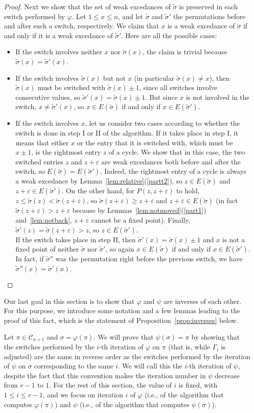 \documentclass[11pt]{amsart}
\newcommand\bit{\begin{itemize}}
\newcommand\eit{\end{itemize}}
\newcommand\C{\mathcal C}
\newcommand\wt{\widetilde}
\newcommand\bij{\varphi}
\newcommand\inv{\psi}
\newcommand\eps{\varepsilon}
\newcommand\sigm{\wt\sigma}
\begin{document}
\begin{proof}
Next we show that the set of weak excedances of $\sigm$ is preserved in each switch performed by $\bij$.
Let $1\le x\le n$, and let $\sigm$ and $\sigm'$ the permutations before and after such a switch, respectively.
We claim that $x$ is a weak excedance of $\sigm$ if and only if it is a weak excedance of $\sigm'$. Here are all the possible cases:
\bit
\item If the switch involves neither $x$ nor $\sigm(x)$, the claim is trivial because $\sigm(x)=\sigm'(x)$.
\item If the switch involves $\sigm(x)$ but not $x$ (in particular $\sigm(x)\neq x$), then $\sigm(x)$ must be switched with $\sigm(x)\pm1$, since all switches involve consecutive values,
so $\sigm'(x)=\sigm(x)\pm1$. But since $x$ is not involved in the switch, $x\neq\sigm'(x)$, so $x\in E(\sigm)$ if and only if $x\in E(\sigm')$.
\item If the switch involves $x$, let us consider two cases according to whether the switch is done in step I or II of the algorithm.
If it takes place in step I, it means that either $x$ or the entry that it is switched with, which must be $x\pm1$,
is the rightmost entry $z$ of a cycle. We show that in this case, the two switched entries $z$ and $z+\eps$ are weak excedances both before and after the switch, so $E(\sigm)=E(\sigm')$.
Indeed, the rightmost entry of a cycle is always a weak excedance by Lemma~\ref{lem:relative}(\ref{partt2}), so $z\in E(\sigm)$ and $z+\eps\in E(\sigm')$.
On the other hand, for $P(z,z+\eps)$ to hold, $z\le \sigm(z)<\sigm(z+\eps)$, so $\sigm(z+\eps)\ge z+\eps$ and $z+\eps\in E(\sigm)$
(in fact $\sigm(z+\eps)> z+\eps$ because by Lemmas~\ref{lem:notmoved}(\ref{part1}) and~\ref{lem:notback}, $z+\eps$ cannot be a fixed point).
Finally, $\sigm'(z)=\sigm(z+\eps)>z$, so $z\in E(\sigm')$.\\
 If the switch takes place in step II, then $\sigm'(x)=\sigm(x)\pm1$ and $x$ is not a fixed point of neither $\sigm$ nor $\sigm'$, so again $x\in E(\sigm)$ if and only if $x\in E(\sigm')$.
In fact, if $\sigm''$ was the permutation right before the previous switch, we have $\sigm''(x)=\sigm'(x)$.
\eit
\end{proof}

Our last goal in this section is to show that $\bij$ and $\inv$ are inverses of each other. For this purpose, we introduce some notation and a few lemmas leading to the proof of this fact,
which is the statement of Proposition~\ref{prop:inverses} below.

Let $\pi\in\C_{n+1}$ and $\sigma=\bij(\pi)$. We will prove that $\inv(\sigma)=\pi$ by showing that the switches performed by the $i$-th iteration of $\bij$ on $\pi$
(that is, while $\Gamma_i$ is adjusted) are the same in reverse order as the switches performed by the iteration of $\inv$ on $\sigma$ corresponding to the same $i$.
We will call this the $i$-th iteration of $\inv$, despite the fact that this convention makes the iteration number in $\inv$ decrease from $r-1$ to $1$.
For the rest of this section, the value of $i$ is fixed, with $1\le i\le r-1$, and we focus on iteration $i$ of $\bij$ (i.e., of the algorithm that computes $\bij(\pi)$)
and $\inv$ (i.e., of the algorithm that computes $\inv(\sigma)$).
\end{document}
